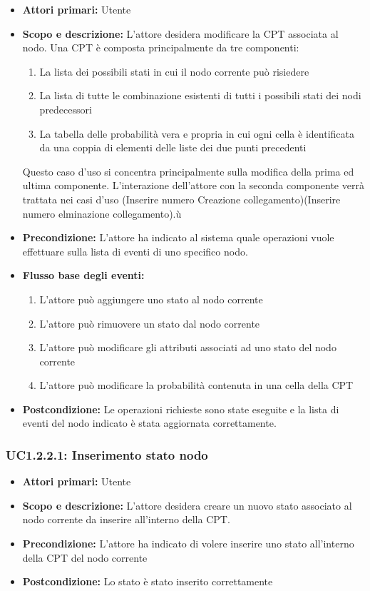 \begin{itemize} 
	\item{\textbf{Attori primari:} Utente} 
	\item{\textbf{Scopo e descrizione:} L'attore desidera modificare la CPT associata al nodo. Una CPT è composta principalmente da tre componenti: 
	\begin{enumerate} 
		\item{La lista dei possibili stati in cui il nodo corrente può risiedere} 
		\item{La lista di tutte le combinazione esistenti di tutti i possibili stati dei nodi predecessori} 
		\item{La tabella delle probabilità vera e propria in cui ogni cella è identificata da una coppia di elementi delle liste dei due punti precedenti} 
	\end{enumerate} 
	Questo caso d'uso si concentra principalmente sulla modifica della prima ed ultima componente. L'interazione dell'attore con la seconda componente verrà trattata nei casi d'uso (Inserire numero Creazione collegamento)(Inserire numero elminazione collegamento).ù
} 
	\item{\textbf{Precondizione:} L'attore ha indicato al sistema quale operazioni vuole effettuare sulla lista di eventi di uno specifico nodo.} 
	\item{\textbf{Flusso base degli eventi:} } 
	\begin{enumerate} 
		\item{L'attore può aggiungere uno stato al nodo corrente} 
		\item{L'attore può rimuovere un stato dal nodo corrente} 
		\item{L'attore può modificare gli attributi associati ad uno stato del nodo corrente} 
		\item{L'attore può modificare la probabilità contenuta in una cella della CPT} 
	\end{enumerate} 
	\item{\textbf{Postcondizione:} Le operazioni richieste sono state eseguite e la lista di eventi del nodo indicato è stata aggiornata correttamente.} 
\end{itemize} 
\subsubsection{UC1.2.2.1: Inserimento stato nodo} 
\begin{itemize} 
	\item{\textbf{Attori primari:} Utente} 
	\item{\textbf{Scopo e descrizione:} L'attore desidera creare un nuovo stato associato al nodo corrente da inserire all'interno della CPT.} 
	\item{\textbf{Precondizione:} L'attore ha indicato di volere inserire uno stato all'interno della CPT del nodo corrente} 
	\item{\textbf{Postcondizione:} Lo stato è stato inserito correttamente} 
\end{itemize} 
